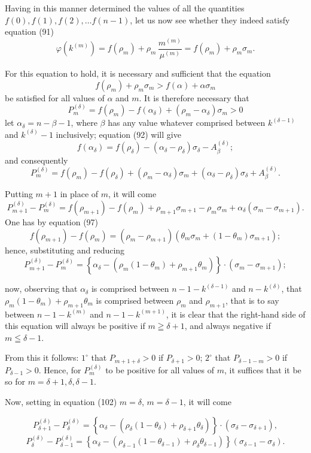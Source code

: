 \documentclass{article}
\begin{document}
Having in this manner determined the values of all the quantities $f(0), f(1), f(2), \ldots f(n-1)$, let us now see whether they indeed satisfy equation (91)
\[ \varphi(k^{(m)}) = f(\rho_m) + \rho_m\,\frac{m^{(m)}}{\mu^{(m)}} = f(\rho_m) + \rho_m \sigma_m. \]

For this equation to hold, it is necessary and sufficient that the equation
\[ f(\rho_m) + \rho_m\sigma_m > f(\alpha) + \alpha\sigma_m \tag{99} \]
be satisfied for all values of $\alpha$ and $m$. It is therefore necessary that
\[ P_m^{(\delta)} = f(\rho_m) - f(\alpha_\delta) + (\rho_m-\alpha_\delta)\sigma_m > 0 \tag{100} \]
let $\alpha_\delta = n-\beta-1$, where $\beta$ has any value whatever comprised between $k^{(\delta-1)}$ and $k^{(\delta)}-1$ inclusively; equation (92) will give
\[ f(\alpha_\delta) = f(\rho_\delta) - (\alpha_\delta-\rho_\delta)\sigma_\delta - A_\beta^{(\delta)}; \]
and consequently
\[ P_m^{(\delta)} = f(\rho_m)-f(\rho_\delta)+(\rho_m-\alpha_\delta)\sigma_m+(\alpha_\delta-\rho_\delta)\sigma_\delta+A_\beta^{(\delta)}. \tag{101} \]

Putting $m+1$ in place of $m$, it will come
\[ P_{m+1}^{(\delta)} - P_m^{(\delta)} = f(\rho_{m+1})-f(\rho_m)+\rho_{m+1}\sigma_{m+1}-\rho_m\sigma_m+\alpha_\delta(\sigma_m-\sigma_{m+1}). \]
One has by equation (97)
\[ f(\rho_{m+1}) - f(\rho_m) = (\rho_m-\rho_{m+1})\left(\theta_m\sigma_m+(1-\theta_m)\sigma_{m+1}\right); \]
hence, substituting and reducing
\[ P_{m+1}^{(\delta)} - P_m^{(\delta)} = \left\{\alpha_\delta - \left(\rho_m(1-\theta_m)+\rho_{m+1}\theta_m\right)\right\} \cdot (\sigma_m-\sigma_{m+1}); \tag{102} \]

now, observing that $\alpha_\delta$ is comprised between $n-1-k^{(\delta-1)}$ and $n-k^{(\delta)}$, that $\rho_m(1-\theta_m)+\rho_{m+1}\theta_m$ is comprised between $\rho_m$ and $\rho_{m+1}$, that is to say between $n-1-k^{(m)}$ and $n-1-k^{(m+1)}$, it is clear that the right-hand side of this equation will always be positive if $m \geqq \delta+1$, and always negative if $m \leqq \delta-1$.

From this it follows: $1^\circ$ that $P_{m+1+\delta} > 0$ if $P_{\delta+1} > 0$; $2^\circ$ that $P_{\delta-1-m} > 0$ if $P_{\delta-1} > 0$. Hence, for $P_m^{(\delta)}$ to be positive for all values of $m$, it suffices that it be so for $m = \delta+1, \delta, \delta-1$.

Now, setting in equation (102) $m = \delta$, $m = \delta-1$, it will come

\[ P_{\delta+1}^{(\delta)} - P_\delta^{(\delta)} = \left\{\alpha_\delta - \left(\rho_\delta(1-\theta_\delta)+\rho_{\delta+1}\theta_\delta\right)\right\} \cdot (\sigma_\delta-\sigma_{\delta+1}), \]
\[ P_\delta^{(\delta)} - P_{\delta-1}^{(\delta)} = \left\{\alpha_\delta - \left(\rho_{\delta-1}(1-\theta_{\delta-1})+\rho_\delta\theta_{\delta-1}\right)\right\}(\sigma_{\delta-1}-\sigma_\delta). \]
\end{document}
